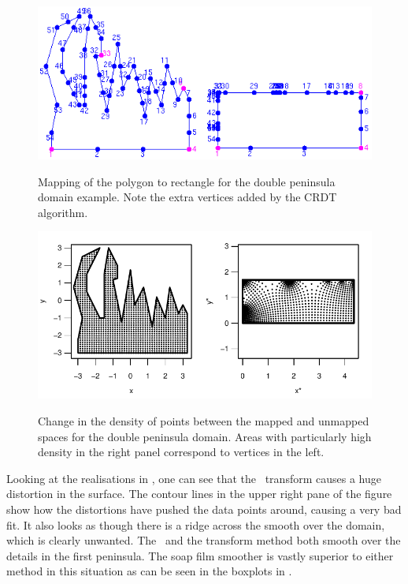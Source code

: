 \begin{figure}
\centering
\includegraphics{sc/figs/wigglytop2-numbered.png} \\
\caption{Mapping of the polygon to rectangle for the double peninsula domain example. Note the extra vertices added by the CRDT algorithm.}
\label{wigglytop2-numbered}
\end{figure}

\begin{figure}
\centering
\includegraphics[width=6in]{sc/figs/wt2-points.pdf} \\
\caption{Change in the density of points between the mapped and unmapped spaces for the double peninsula domain. Areas with particularly high density in the right panel correspond to vertices in the left.}
\label{wt2-points}
\end{figure}

Looking at the realisations in , one can see that the \sch\ transform causes a huge distortion in the surface. The contour lines in the upper right pane of the figure show how the distortions have pushed the data points around, causing a very bad fit. It also looks as though there is a ridge across the smooth over the domain, which is clearly unwanted. The \tprs\ and the transform method both smooth over the details in the first peninsula. The soap film smoother is vastly superior to either method in this situation as can be seen in the boxplots in .

